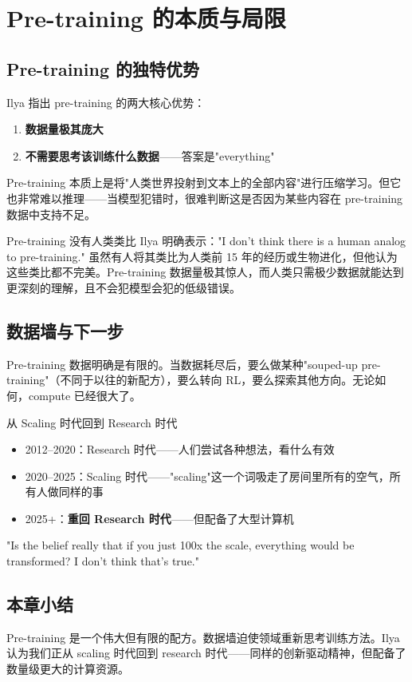 \section{Pre-training 的本质与局限}

\subsection{Pre-training 的独特优势}

Ilya 指出 pre-training 的两大核心优势：
\begin{enumerate}
    \item \textbf{数据量极其庞大}
    \item \textbf{不需要思考该训练什么数据}——答案是"everything"
\end{enumerate}

Pre-training 本质上是将"人类世界投射到文本上的全部内容"进行压缩学习。但它也非常难以推理——当模型犯错时，很难判断这是否因为某些内容在 pre-training 数据中支持不足。

\begin{warningbox}{Pre-training 没有人类类比}
Ilya 明确表示："I don't think there is a human analog to pre-training." 虽然有人将其类比为人类前 15 年的经历或生物进化，但他认为这些类比都不完美。Pre-training 数据量极其惊人，而人类只需极少数据就能达到更深刻的理解，且不会犯模型会犯的低级错误。
\end{warningbox}

\subsection{数据墙与下一步}

Pre-training 数据明确是有限的。当数据耗尽后，要么做某种"souped-up pre-training"（不同于以往的新配方），要么转向 RL，要么探索其他方向。无论如何，compute 已经很大了。

\begin{importantbox}{从 Scaling 时代回到 Research 时代}
\begin{itemize}
    \item 2012--2020：Research 时代——人们尝试各种想法，看什么有效
    \item 2020--2025：Scaling 时代——"scaling"这一个词吸走了房间里所有的空气，所有人做同样的事
    \item 2025+：\textbf{重回 Research 时代}——但配备了大型计算机
\end{itemize}
"Is the belief really that if you just 100x the scale, everything would be transformed? I don't think that's true."
\end{importantbox}

\subsection{本章小结}

Pre-training 是一个伟大但有限的配方。数据墙迫使领域重新思考训练方法。Ilya 认为我们正从 scaling 时代回到 research 时代——同样的创新驱动精神，但配备了数量级更大的计算资源。


